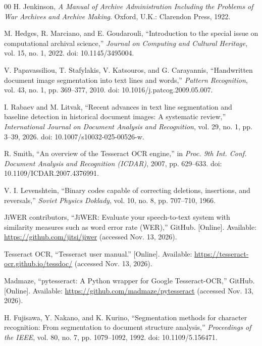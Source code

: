 \begin{thebibliography}{00}
H. Jenkinson, \emph{A Manual of Archive Administration Including the Problems of War Archives and Archive Making}. Oxford, U.K.: Clarendon Press, 1922.

M. Hedges, R. Marciano, and E. Goudarouli, ``Introduction to the special issue on computational archival science,'' \emph{Journal on Computing and Cultural Heritage}, vol. 15, no. 1, 2022. doi: 10.1145/3495004.

V. Papavassiliou, T. Stafylakis, V. Katsouros, and G. Carayannis, ``Handwritten document image segmentation into text lines and words,'' \emph{Pattern Recognition}, vol. 43, no. 1, pp. 369--377, 2010. doi: 10.1016/j.patcog.2009.05.007.

I. Rabaev and M. Litvak, ``Recent advances in text line segmentation and baseline detection in historical document images: A systematic review,'' \emph{International Journal on Document Analysis and Recognition}, vol. 29, no. 1, pp. 3--39, 2026. doi: 10.1007/s10032-025-00526-w.

R. Smith, ``An overview of the Tesseract OCR engine,'' in \emph{Proc. 9th Int. Conf. Document Analysis and Recognition (ICDAR)}, 2007, pp. 629--633. doi: 10.1109/ICDAR.2007.4376991.

V. I. Levenshtein, ``Binary codes capable of correcting deletions, insertions, and reversals,'' \emph{Soviet Physics Doklady}, vol. 10, no. 8, pp. 707--710, 1966.

JiWER contributors, ``JiWER: Evaluate your speech-to-text system with similarity measures such as word error rate (WER),'' GitHub. [Online]. Available: \url{https://github.com/jitsi/jiwer} (accessed Nov. 13, 2026).

Tesseract OCR, ``Tesseract user manual.'' [Online]. Available: \url{https://tesseract-ocr.github.io/tessdoc/} (accessed Nov. 13, 2026).

Madmaze, ``pytesseract: A Python wrapper for Google Tesseract-OCR,'' GitHub. [Online]. Available: \url{https://github.com/madmaze/pytesseract} (accessed Nov. 13, 2026).

H. Fujisawa, Y. Nakano, and K. Kurino, ``Segmentation methods for character recognition: From segmentation to document structure analysis,'' \emph{Proceedings of the IEEE}, vol. 80, no. 7, pp. 1079--1092, 1992. doi: 10.1109/5.156471.


\end{thebibliography}
